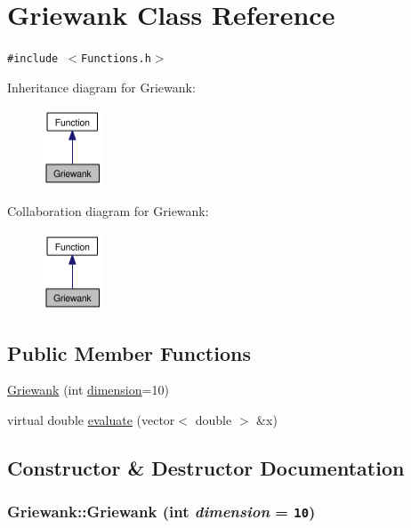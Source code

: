 \hypertarget{classGriewank}{
\section{Griewank Class Reference}
\label{classGriewank}
}
{\tt \#include $<$Functions.h$>$}

Inheritance diagram for Griewank:\nopagebreak
\begin{figure}[H]
\begin{center}
\leavevmode
\includegraphics[width=50pt]{classGriewank__inherit__graph}
\end{center}
\end{figure}
Collaboration diagram for Griewank:\nopagebreak
\begin{figure}[H]
\begin{center}
\leavevmode
\includegraphics[width=50pt]{classGriewank__coll__graph}
\end{center}
\end{figure}
\subsection*{Public Member Functions}
\begin{CompactItemize}
\item 
\hyperlink{classGriewank_a9daafa9330b7fbf32e83f9876e14043}{Griewank} (int \hyperlink{aco-r_8cpp_1a8a8235879363159315091a1daed72f}{dimension}=10)
\item 
virtual double \hyperlink{classGriewank_c34b1c32bfb7b867c6772db5cc6a727f}{evaluate} (vector$<$ double $>$ \&x)
\end{CompactItemize}


\subsection{Constructor \& Destructor Documentation}
\hypertarget{classGriewank_a9daafa9330b7fbf32e83f9876e14043}{
\subsubsection{\setlength{\rightskip}{0pt plus 5cm}Griewank::Griewank (int {\em dimension} = {\tt 10})}}
\label{classGriewank_a9daafa9330b7fbf32e83f9876e14043}




